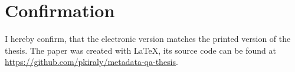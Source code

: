 \chapter{Confirmation}

I hereby confirm, that the electronic version matches the printed version of the thesis. The paper was created with \LaTeX, its source code can be found at \url{https://github.com/pkiraly/metadata-qa-thesis}.